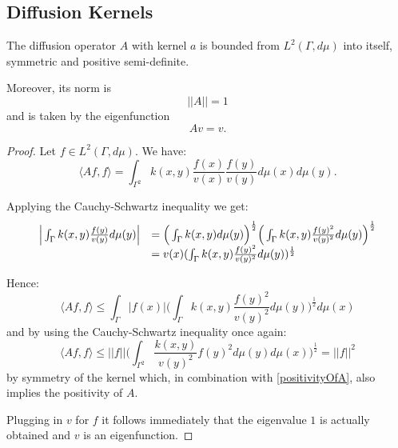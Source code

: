 \subsection{Diffusion Kernels}
\begin{theorem}
The diffusion operator $A$ with kernel $a$ is bounded from $L^2(\Gamma, d\mu)$ into itself, symmetric and positive semi-definite.

Moreover, its norm is $$||A||=1$$ and is taken by the eigenfunction $$Av=v.$$
\end{theorem}
\begin{proof}
Let $f\in L^2(\Gamma, d\mu)$. We have:
\begin{equation}\label{positivityOfA}
\langle Af,f \rangle = \int_{\Gamma^2}k(x,y)\frac{f(x)}{v(x)}\frac{f(y)}{v(y)}d\mu(x)d\mu(y).
\end{equation}

Applying the Cauchy-Schwartz inequality we get:
\begin{equation*}\begin{array}{l l}
\Big|\int_\Gamma k(x,y)\frac{f(y)}{v(y)}d\mu(y)\Big| &= 
\Big(\int_\Gamma k(x,y)d\mu(y)\Big)^{\frac{1}{2}}
\Big(\int_\Gamma k(x,y)\frac{f(y)^2}{v(y)^2} d\mu(y)\Big)^{\frac{1}{2}} \\
&=v(x)(\int_\Gamma k(x,y)\frac{f(y)^2}{v(y)^2} d\mu(y))^{\frac{1}{2}}
\end{array}\end{equation*}

Hence:
$$\langle Af,f \rangle \leq \int_\Gamma |f(x)|\Big(\int_\Gamma k(x,y)\frac{f(y)^2}{v(y)^2} d\mu(y)\Big)^{\frac{1}{2}}d\mu(x)$$
and by using the Cauchy-Schwartz inequality once again:
$$\langle Af,f \rangle \leq ||f||\Big(\int_{\Gamma^2} \frac{k(x,y)}{v(y)^2}f(y)^2 d\mu(y)d\mu(x)\Big)^{\frac{1}{2}} = ||f||^2$$ by symmetry of the kernel which, in combination with \ref{positivityOfA}, also implies the positivity of $A$.

Plugging in $v$ for $f$ it follows immediately that the eigenvalue $1$ is actually obtained and $v$ is an eigenfunction.
\end{proof}

